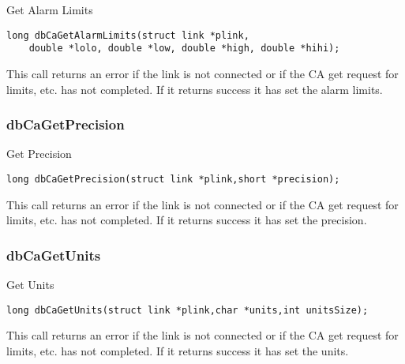 Get Alarm Limits

\begin{verbatim}
long dbCaGetAlarmLimits(struct link *plink,
    double *lolo, double *low, double *high, double *hihi);
\end{verbatim}

This call returns an error if the link is not connected or if the CA get request for limits, etc. has not completed.
If it returns success it has set the alarm limits.

\subsubsection{dbCaGetPrecision}

Get Precision

\begin{verbatim}
long dbCaGetPrecision(struct link *plink,short *precision);
\end{verbatim}

This call returns an error if the link is not connected or if the CA get request for limits, etc. has not completed.
If it returns success it has set the precision.

\subsubsection{dbCaGetUnits}

Get Units

\begin{verbatim}
long dbCaGetUnits(struct link *plink,char *units,int unitsSize);
\end{verbatim}

This call returns an error if the link is not connected or if the CA get request for limits, etc. has not completed.
If it returns success it has set the units.
